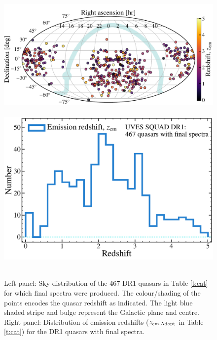 \documentclass[fleqn,usenatbib,usedcolumn]{mnras}
\newcommand{\Tref}[1]{Table \ref{#1}}
\begin{document}
\begin{figure}
\begin{center}
\centerline{\hbox{
    \includegraphics[width=1.10\columnwidth]{DR1_skymap.pdf}
    \hspace{0.01\columnwidth}
    \includegraphics[width=0.78\columnwidth]{DR1_zemdist.pdf}
}}\vspace{-0.5em}
\caption{Left panel: Sky distribution of the 467 DR1 quasars in \Tref{t:cat} for which final spectra were produced. The colour/shading of the points encodes the quasar redshift as indicated. The light blue shaded stripe and bulge represent the Galactic plane and centre. Right panel: Distribution of emission redshifts ($z_{\rm em,Adopt}$ in \Tref{t:cat}) for the DR1 quasars with final spectra.}
\label{f:sky+zem}
\end{center}
\end{figure}
\end{document}
